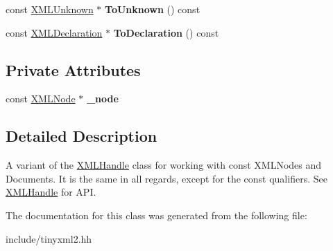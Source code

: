 \begin{DoxyCompactItemize}
\item 
const \hyperlink{classtinyxml2_1_1XMLUnknown}{X\+M\+L\+Unknown} $\ast$ {\bfseries To\+Unknown} () const \hypertarget{classtinyxml2_1_1XMLConstHandle_acb358a329e54fa204ed2d0b181566828}{}\label{classtinyxml2_1_1XMLConstHandle_acb358a329e54fa204ed2d0b181566828}

\item 
const \hyperlink{classtinyxml2_1_1XMLDeclaration}{X\+M\+L\+Declaration} $\ast$ {\bfseries To\+Declaration} () const \hypertarget{classtinyxml2_1_1XMLConstHandle_a5de0c175845bc30a6f9b3d88d8877eaf}{}\label{classtinyxml2_1_1XMLConstHandle_a5de0c175845bc30a6f9b3d88d8877eaf}

\end{DoxyCompactItemize}
\subsection*{Private Attributes}
\begin{DoxyCompactItemize}
\item 
const \hyperlink{classtinyxml2_1_1XMLNode}{X\+M\+L\+Node} $\ast$ {\bfseries \+\_\+node}\hypertarget{classtinyxml2_1_1XMLConstHandle_ad4d8db839660ef730adfa2439945c4da}{}\label{classtinyxml2_1_1XMLConstHandle_ad4d8db839660ef730adfa2439945c4da}

\end{DoxyCompactItemize}


\subsection{Detailed Description}
A variant of the \hyperlink{classtinyxml2_1_1XMLHandle}{X\+M\+L\+Handle} class for working with const X\+M\+L\+Nodes and Documents. It is the same in all regards, except for the \textquotesingle{}const\textquotesingle{} qualifiers. See \hyperlink{classtinyxml2_1_1XMLHandle}{X\+M\+L\+Handle} for A\+PI. 

The documentation for this class was generated from the following file\+:\begin{DoxyCompactItemize}
\item 
include/tinyxml2.\+hh\end{DoxyCompactItemize}
